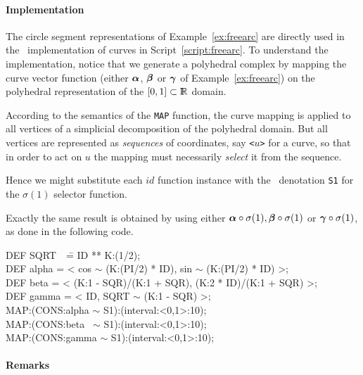 \documentclass{31x47jw}
\begin{document}
\paragraph{Implementation}

The circle segment representations of Example~\ref{ex:freearc} are directly
used in the \pl\ implementation of curves in
Script~\ref{script:freearc}.  To understand the implementation, notice
that we generate a polyhedral complex by mapping the curve vector
function (either ${\mbox{\boldmath $\alpha$}}$, ${\mbox{\boldmath $\beta$}}$ or ${\mbox{\boldmath $\gamma$}}$ of
Example~\ref{ex:freearc}) on the polyhedral representation of the
$[0,1]\subset\mathbb{I\!\!R}$ domain.

According to the semantics of the \texttt{MAP} function, the curve
mapping is applied to all vertices of a simplicial decomposition of
the polyhedral domain.  But all vertices are represented as
\emph{sequences} of coordinates, say \texttt{<$u$>} for a curve, so
that in order to act on $u$ the mapping must necessarily \emph{select}
it from the sequence.

Hence we might substitute each $id$ function instance with the \pl\
denotation \texttt{S1} for the $\sigma(1)$ selector function.  

Exactly the same result is obtained by using either
${\mbox{\boldmath $\alpha$}}\circ\sigma(1), {\mbox{\boldmath $\beta$}}\circ\sigma(1)$ or
${\mbox{\boldmath $\gamma$}}\circ\sigma(1)$, as done in the following code. 

\begin{script} 
\begin{smallplasm}
DEF SQRT~~\== ID ** K:(1/2);\\[0.3cm]
DEF alpha \>= < cos $\sim$ (K:(PI/2) * ID), sin $\sim$ (K:(PI/2) * 
ID) >; \\
DEF beta  \>= < (K:1 - SQR)/(K:1 + SQR),  (K:2 * ID)/(K:1 + SQR) >;\\
DEF gamma \>= < ID, SQRT $\sim$ (K:1 - SQR) >;\\[0.3cm]

MAP:(CONS:alpha $\sim$ S1):(interval:<0,1>:10);\\
MAP:(CONS:beta~ $\sim$ S1):(interval:<0,1>:10);\\
MAP:(CONS:gamma $\sim$ S1):(interval:<0,1>:10);
\end{smallplasm}
\label{script:freearc}
\end{script}

\paragraph{Remarks}
\end{document}
